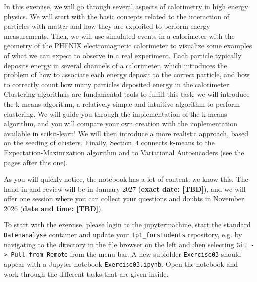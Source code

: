 \documentclass[a4paper,12pt]{article}
\begin{document}
\names %

In this exercise, we will go through several aspects of calorimetry in high energy physics. 
We will start with the basic concepts related to the interaction of particles with matter and how they are exploited to perform energy measurements.
Then, we will use simulated events in a calorimeter with the geometry of the \href{https://www.phenix.bnl.gov/}{PHENIX} electromagnetic calorimeter to visualize some examples of what we can expect to observe in a real experiment.
Each particle typically deposits energy in several channels of a calorimeter, which introduces the problem of how to associate each energy deposit to the correct particle, and how to correctly count how many particles deposited energy in the calorimeter.
Clustering algorithms are fundamental tools to fulfill this task: we will introduce the k-means algorithm, a relatively simple and intuitive algorithm to perform clustering.
We will guide you through the implementation of the k-means algorithm, and you will compare your own creation with the implementation available in scikit-learn!
We will then introduce a more realistic approach, based on the seeding of clusters.
Finally, Section~4 connects k-means to the Expectation-Maximization algorithm and to Variational Autoencoders (see the pages after this one).

As you will quickly notice, the notebook has a lot of content: we know this. The hand-in and review will be in January 2027 (\textbf{exact date: [TBD]}), and we will offer one session where you can collect your questions and doubts in November 2026 (\textbf{date and time: [TBD]}).

To start with the exercise, please login to the \href{https://jupytermachine.etp.kit.edu}{jupytermachine}, 
start the standard \texttt{Datenanalyse} container and update your \texttt{tp1\_forstudents} repository, 
e.g. by navigating to the directory in the file browser on the left and then selecting \texttt{Git -> Pull from Remote} from the menu bar. 
A new subfolder \texttt{Exercise03} should appear with a Jupyter notebook \texttt{Exercise03.ipynb}. 
Open the notebook and work through the different tasks that are given inside.
\end{document}

